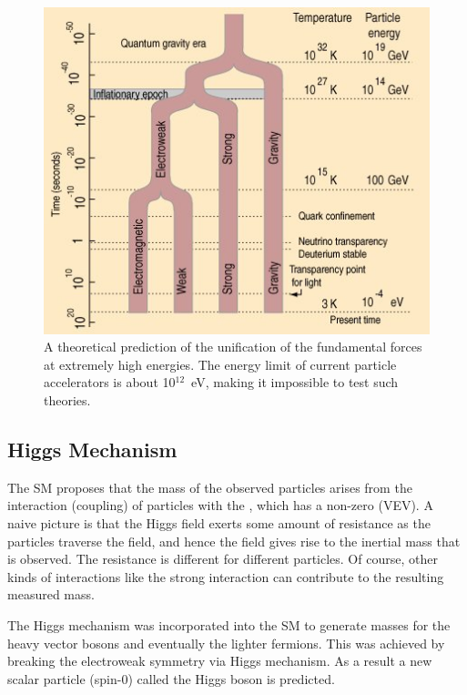 \begin{figure}[p]
 \centering
 \includegraphics[scale=0.99 ,keepaspectratio=true]{./guts_forceUnification2.jpg}
 \caption[Unification of the fundamental forces at extremely high energies.]{A theoretical prediction of the unification of the fundamental forces at extremely high energies. The energy limit of current particle accelerators is about 10$^{12}$~eV, making it impossible to test such theories.}
 \label{fig:TOE_ForceUnified}
\end{figure}

\subsection{Higgs Mechanism}\label{sec:EWKSymmetryBreaking}
The SM proposes that the mass of the observed particles arises from the interaction (coupling) of particles with the , which has a non-zero  (VEV). A naive picture is that the Higgs field exerts some amount of resistance as the particles traverse the field, and hence the field gives rise to the inertial mass that is observed. The resistance is different for different particles. Of course, other kinds of interactions like the strong interaction can contribute to the resulting measured mass.

The Higgs mechanism was incorporated into the SM to generate masses for the heavy vector bosons and eventually the lighter fermions. This was achieved by breaking the electroweak symmetry via Higgs mechanism. As a result a new scalar particle (spin-0) called the Higgs boson is predicted.

